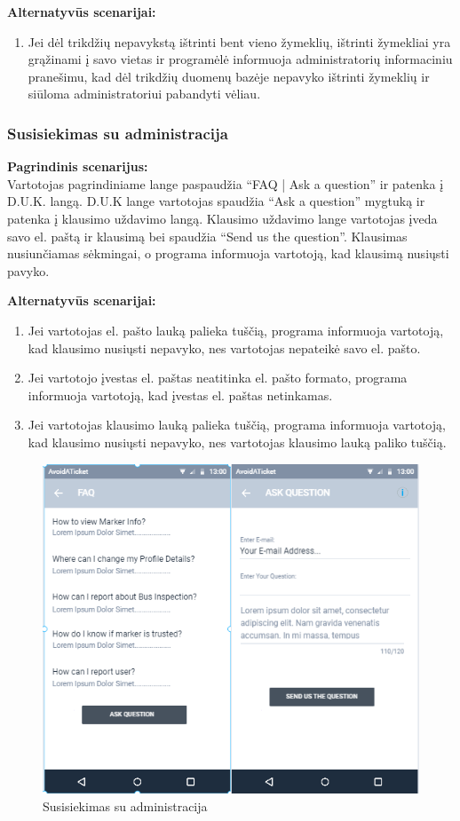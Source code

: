 \documentclass{VUMIFPSkursinis}
\begin{document}
	\textbf{Alternatyvūs scenarijai:}
	\begin{enumerate}
		\item Jei dėl trikdžių nepavykstą ištrinti bent vieno žymeklių, ištrinti žymekliai yra grąžinami į savo vietas ir programėlė informuoja administratorių informaciniu pranešimu, kad dėl trikdžių duomenų bazėje nepavyko ištrinti žymeklių ir siūloma administratoriui pabandyti vėliau.
	\end{enumerate} 

\subsubsection{Susisiekimas su administracija}
	\textbf{Pagrindinis scenarijus:}\\
	Vartotojas pagrindiniame lange paspaudžia “FAQ | Ask a question” ir patenka į D.U.K. langą. D.U.K lange vartotojas 
	spaudžia “Ask a question” mygtuką ir patenka į klausimo uždavimo langą. Klausimo uždavimo lange vartotojas įveda 
	savo el. paštą ir klausimą bei spaudžia “Send us the question”. Klausimas nusiunčiamas sėkmingai, o programa informuoja 
	vartotoją, kad klausimą nusiųsti pavyko.

	\textbf{Alternatyvūs scenarijai:}
	\begin{enumerate}
		\item Jei vartotojas el. pašto lauką palieka tuščią, programa informuoja vartotoją, kad klausimo nusiųsti nepavyko, nes vartotojas nepateikė savo el. pašto.
		\item Jei vartotojo įvestas el. paštas neatitinka el. pašto formato, programa informuoja vartotoją, kad įvestas el. paštas netinkamas.
		\item Jei vartotojas klausimo lauką palieka tuščią, programa informuoja vartotoją, kad klausimo nusiųsti nepavyko, nes vartotojas klausimo lauką paliko tuščią.
	\end{enumerate} 
	\begin{figure}[H]
				\centering
				\includegraphics[scale=1.4]{img/mockup_admincomunication}
				\caption{Susisiekimas su administracija}
				\label{img:Susisiekimas su administracija}
			\end{figure}
\end{document}
